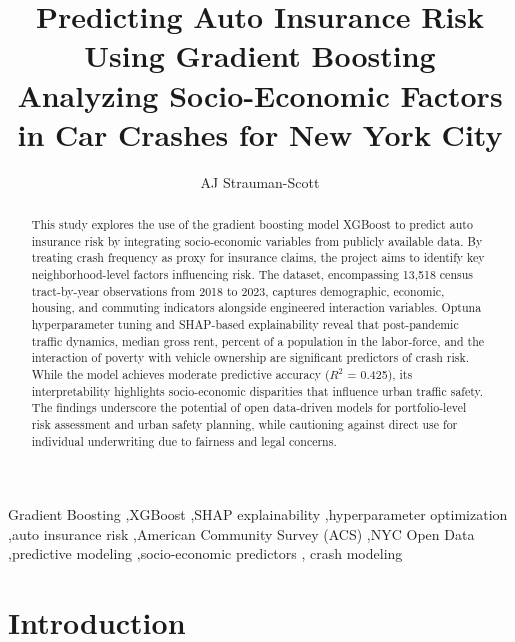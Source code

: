 \documentclass[
  number,
  review,
  3p]{elsarticle}
\begin{document}
\begin{frontmatter}
\title{Predicting Auto Insurance Risk Using Gradient
Boosting \\\large{Analyzing Socio-Economic Factors in Car Crashes for
New York City} }
\author[1]{AJ Strauman-Scott%
%
}



        
\begin{abstract}
This study explores the use of the gradient boosting model XGBoost to
predict auto insurance risk by integrating socio-economic variables from
publicly available data. By treating crash frequency as proxy for
insurance claims, the project aims to identify key neighborhood-level
factors influencing risk. The dataset, encompassing 13,518 census
tract-by-year observations from 2018 to 2023, captures demographic,
economic, housing, and commuting indicators alongside engineered
interaction variables. Optuna hyperparameter tuning and SHAP-based
explainability reveal that post-pandemic traffic dynamics, median gross
rent, percent of a population in the labor-force, and the interaction of
poverty with vehicle ownership are significant predictors of crash risk.
While the model achieves moderate predictive accuracy (\(R^2\) = 0.425),
its interpretability highlights socio-economic disparities that
influence urban traffic safety. The findings underscore the potential of
open data-driven models for portfolio-level risk assessment and urban
safety planning, while cautioning against direct use for individual
underwriting due to fairness and legal concerns.
\end{abstract}





\begin{keyword}
    Gradient Boosting \sep XGBoost \sep SHAP
explainability \sep hyperparameter optimization \sep auto insurance
risk \sep American Community Survey (ACS) \sep NYC Open
Data \sep predictive modeling \sep socio-economic predictors \sep 
    crash modeling
\end{keyword}
\end{frontmatter}
    

\section{Introduction}\label{sec-intro}
\end{document}
